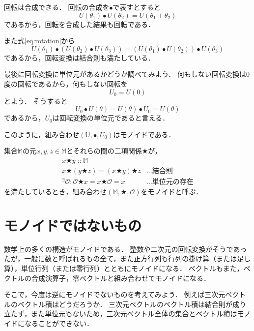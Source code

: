 \documentclass[twocolumn]{jsbook}
\newenvironment{point}{\begin{screen}}{\end{screen}}
\newcommand{\istypeof}{\mathop{::}}
\newcommand{\mathbinaryop}{\bigstar}
\newcommand{\mathidentity}{\mathcal{O}}
\newcommand{\mathsetname}[1]{\mathbb{#1}}
\newcommand{\mathtriple}[3]{(#1,#2,#3)}
\newcommand{\mathcompose}{\bullet}
\begin{document}
回転は合成できる．
回転の合成を$\bullet$で表すとすると
\begin{equation}
\label{eq:rotation}
U(\theta_1)\bullet U(\theta_2)=U(\theta_1+\theta_2)
\end{equation}
であるから，回転を合成した結果も回転である．

また式\eqref{eq:rotation}から$$U(\theta_1)\bullet\left(U(\theta_2)\bullet U(\theta_3)\right)=\left(U(\theta_1)\bullet U(\theta_2)\right)\bullet U(\theta_3)$$
であるから，回転変換は結合則も満たしている．

最後に回転変換に単位元があるかどうか調べてみよう．
何もしない回転変換は$0$度の回転であるから，何もしない回転を$$U_0=U(0)$$とよう．
そうすると$$U_0\bullet U(\theta)=U(\theta)\bullet U_0=U(\theta)$$であるから，$U_0$は回転変換の単位元であると言える．

このように，組み合わせ$\mathtriple{\mathsetname{U}}{\mathcompose}{U_0}$はモノイドである．

\begin{point}
集合$\mathsetname{M}$の元$x,y,z\in\mathsetname{M}$とそれらの間の二項関係$\mathbinaryop$が，
\begin{align*}
x\mathbinaryop y\istypeof\mathsetname{M}\\
x\mathbinaryop(y\mathbinaryop z)=(x\mathbinaryop y)\mathbinaryop z&\dots\text{結合則}\\
{}^\exists\mathidentity:\mathidentity\mathbinaryop x=x\mathbinaryop\mathidentity=x&\dots\text{単位元の存在}
\end{align*}
を満たしているとき，組み合わせ$\mathtriple{\mathsetname{M}}{\mathbinaryop}{\mathidentity}$をモノイドと呼ぶ．
\end{point}

\section{モノイドではないもの}
数学上の多くの構造がモノイドである．
整数や二次元の回転変換がそうであったが，一般に数と呼ばれるもの全て，また正方行列も行列の掛け算（または足し算），単位行列（または零行列）とともにモノイドになる．
ベクトルもまた，ベクトルの合成演算子，零ベクトルと組み合わせてモノイドになる．

そこで，今度は逆にモノイドでないものを考えてみよう．
例えば三次元ベクトルのベクトル積はどうだろうか．
三次元ベクトルのベクトル積は結合則が成り立たず，また単位元もないため，三次元ベクトル全体の集合とベクトル積はモノイドになることができない．
\end{document}
